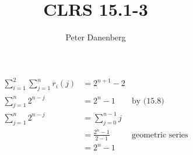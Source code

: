 \documentclass{article}
\title{CLRS 15.1-3}
\author{Peter Danenberg}
\begin{document}
\maketitle
\begin{align}
  \sum_{i=1}^2\sum_{j=1}^nr_i(j) &= 2^{n+1}-2 \\
  \sum_{j=1}^n2^{n-j} &= 2^{n}-1 & \text{by (15.8)} \\
  \sum_{j=1}^n2^{n-j} &= \sum_{j=0}^{n-1}j \\
  &= \frac{2^n-1}{2-1} & \text{geometric series}\\
  &= 2^n-1
\end{align}
\end{document}
